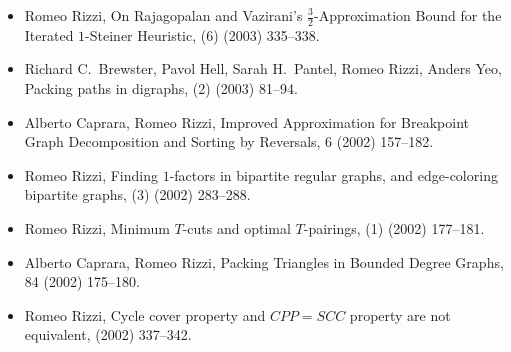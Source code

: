\documentclass[10pt]{article}
\begin{document}
\begin{itemize}
  \vspace{1.4mm}
  \item {\sc Romeo Rizzi},
   \newblock  On Rajagopalan and Vazirani's $\frac{3}{2}$-Approximation
              Bound for the Iterated $1$-Steiner Heuristic,
    (6) (2003) 335--338.

  \vspace{1.4mm}
  \item {\sc Richard C.~Brewster, Pavol Hell, Sarah H.~Pantel, Romeo Rizzi, Anders Yeo},
   \newblock  Packing paths in digraphs,
    (2) (2003) 81--94.

  \vspace{1.4mm}
  \item {\sc Alberto Caprara, Romeo Rizzi},
   \newblock  Improved Approximation for Breakpoint Graph Decomposition
              and Sorting by Reversals,
    6 (2002) 157--182.

  \vspace{1.4mm}
  \item {\sc Romeo Rizzi},
   \newblock  Finding $1$-factors in bipartite regular graphs,
              and edge-coloring bipartite graphs,
    (3) (2002) 283--288. 

  \vspace{1.4mm}
  \item {\sc Romeo Rizzi},
   \newblock  Minimum $T$-cuts and optimal $T$-pairings,
    (1) (2002) 177--181.

  \vspace{1.4mm}
  \item {\sc Alberto Caprara, Romeo Rizzi},
   \newblock  Packing Triangles in Bounded Degree Graphs,
    84 (2002) 175--180.

  \vspace{1.4mm}
  \item {\sc Romeo Rizzi},
   \newblock  Cycle cover property and $CPP=SCC$ property are not equivalent,
    (2002) 337--342.


\end{itemize}
\end{document}
